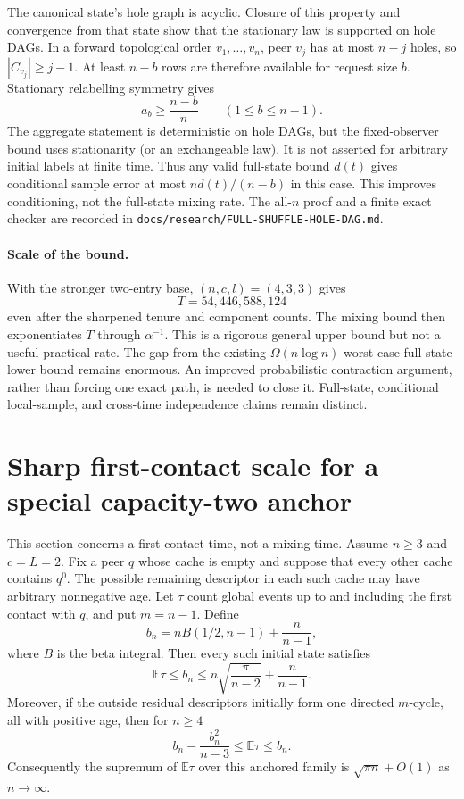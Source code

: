 \documentclass[11pt]{article}
\begin{document}
The canonical state's hole graph is acyclic. Closure of this property and
convergence from that state show that the stationary law is supported on
hole DAGs. In a forward topological order $v_1,\ldots,v_n$, peer $v_j$ has
at most $n-j$ holes, so $|C_{v_j}|\ge j-1$. At least $n-b$ rows are
therefore available for request size $b$. Stationary relabelling symmetry
gives
\[
 a_b\ge\frac{n-b}{n}\qquad(1\le b\le n-1).
\]
The aggregate statement is deterministic on hole DAGs, but the fixed-observer
bound uses stationarity (or an exchangeable law). It is not asserted for
arbitrary initial labels at finite time. Thus any valid full-state bound
$d(t)$ gives conditional sample error at most $nd(t)/(n-b)$ in this case.
This improves conditioning, not the full-state mixing rate. The all-$n$
proof and a finite exact checker are recorded in
\texttt{docs/research/FULL-SHUFFLE-HOLE-DAG.md}.

\paragraph{Scale of the bound.}
With the stronger two-entry base, $(n,c,l)=(4,3,3)$ gives
\[T=54{,}446{,}588{,}124\]
even after the sharpened tenure and component counts.
The mixing bound then exponentiates $T$ through $\alpha^{-1}$.
This is a rigorous general upper bound but not a useful practical rate.
The gap from the existing $\Omega(n\log n)$ worst-case full-state lower
bound remains enormous. An improved probabilistic contraction argument,
rather than forcing one exact path, is needed to close it. Full-state,
conditional local-sample, and cross-time independence claims remain distinct.
\section{Sharp first-contact scale for a special capacity-two anchor}
\label{sec:c2-anchor-sharp}
This section concerns a first-contact time, not a mixing time. Assume
$n\ge3$ and $c=L=2$. Fix a peer $q$ whose cache is empty and suppose that
every other cache contains $q^0$. The possible remaining descriptor in
each such cache may have arbitrary nonnegative age. Let $\tau$ count global
events up to and including the first contact with $q$, and put $m=n-1$.
Define
\[
 b_n=n B(1/2,n-1)+\frac{n}{n-1},
\]
where $B$ is the beta integral. Then every such initial state satisfies
\[
 \mathbb E\tau\le b_n\le n\sqrt{\frac{\pi}{n-2}}+\frac{n}{n-1}.
\]
Moreover, if the outside residual descriptors initially form one directed
$m$-cycle, all with positive age, then for $n\ge4$
\[
 b_n-\frac{b_n^2}{n-3}\le\mathbb E\tau\le b_n.
\]
Consequently the supremum of $\mathbb E\tau$ over this anchored family is
$\sqrt{\pi n}+O(1)$ as $n\to\infty$.
\end{document}
